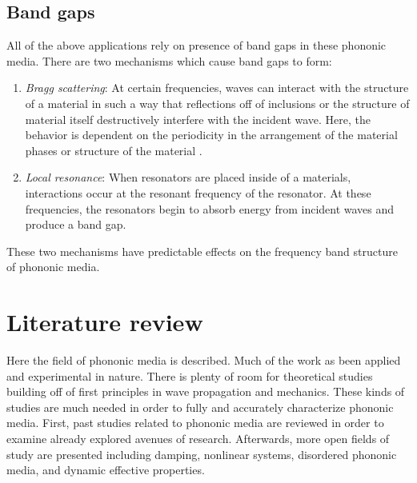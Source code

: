 \documentclass{article}
\begin{document}
\subsection{Band gaps}
All of the above applications rely on presence of band gaps in these phononic 
media. There are two mechanisms which cause band gaps to form:
\begin{enumerate}
	\item \emph{Bragg scattering}: At certain frequencies, waves can interact 
	with the structure of a material in such a way that reflections off of 
	inclusions or the structure of material itself destructively interfere with 
	the incident wave. Here, the behavior is dependent on the periodicity in 
	the arrangement of the material phases or structure of the material 
	\cite{laude15}.
	\item \emph{Local resonance}: When resonators are placed inside of a 
	materials, interactions occur at the resonant frequency of the resonator. 
	At these frequencies, the resonators begin to absorb energy from incident 
	waves and produce a band gap.
\end{enumerate}
These two mechanisms have predictable effects on the frequency band structure 
of phononic media. 


\section{Literature review}
Here the field of phononic media is described. Much of the work as been applied 
and experimental in nature. There is plenty of room for theoretical studies 
building off of first principles in wave propagation and mechanics. These kinds 
of studies are much needed in order to fully and accurately characterize 
phononic media. First, past studies related to phononic media are reviewed in 
order to examine already explored avenues of research. Afterwards, more open 
fields of study are presented including damping, nonlinear systems, disordered 
phononic media, and dynamic effective properties.
\end{document}
